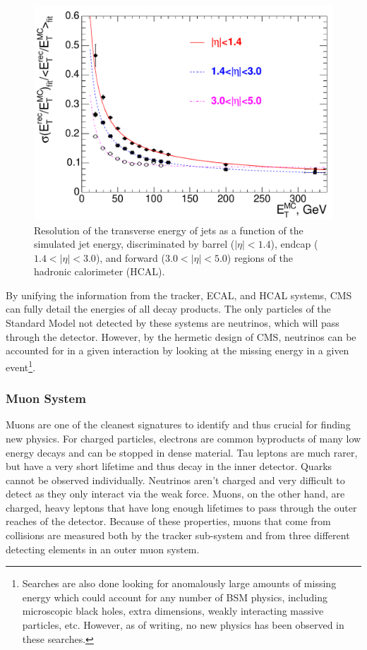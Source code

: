 \begin{figure}[htbp]
\begin{center}
\includegraphics[width=.7\linewidth]{Experiment/figures/HCALResolution.pdf}
\caption[Resolution of the Hadronic Calorimeter as a Function of Simulated Transverse Energy]{Resolution of the transverse energy of jets as a function of the simulated jet energy, discriminated by barrel ($|\eta|<1.4$), endcap ($1.4<|\eta|<3.0$), and forward ($3.0<|\eta|<5.0$) regions of the hadronic calorimeter (HCAL).}
\label{fig:HCALResolution}
\end{center}
\end{figure}

By unifying the information from the tracker, ECAL, and HCAL systems, CMS can fully detail the energies of all decay products. The only particles of the Standard Model not detected by these systems are neutrinos, which will pass through the detector. However, by the hermetic design of CMS, neutrinos can be accounted for in a given interaction by looking at the missing energy in a given event\footnote{Searches are also done looking for anomalously large amounts of missing energy which could account for any number of BSM physics, including microscopic black holes, extra dimensions, weakly interacting massive particles, etc. However, as of writing, no new physics has been observed in these searches.}. 

\subsubsection{Muon System}
\label{sec:MuonSystem}

Muons are one of the cleanest signatures to identify and thus crucial for finding new physics. For charged particles, electrons are common byproducts of many low energy decays and can be stopped in dense material. Tau leptons are much rarer, but have a very short lifetime and thus decay in the inner detector. Quarks cannot be observed individually. Neutrinos aren't charged and very difficult to detect as they only interact via the weak force. Muons, on the other hand, are charged, heavy leptons that have long enough lifetimes to pass through the outer reaches of the detector. Because of these properties, muons that come from collisions are measured both by the tracker sub-system and from three different detecting elements in an outer muon system. 

